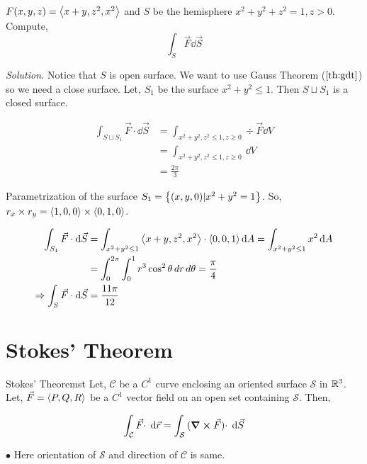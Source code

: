 \documentclass[../Analysis-3]{subfiles}
\begin{document}
\begin{Eg}{}{}
    $F (x,y,z) = \left\langle {x+y}, {z^2,x^2} \right\rangle$ and $S$ be the hemisphere $x^2+y^2+z^2 = 1, z>0$. Compute,
    \[\int_{S} \vec{F} \dd \vec{S}\]

    \textit{Solution.} Notice that $S$ is open surface. We want to  use Gauss Theorem ($\ref{th:gdt}$) so we need a close surface. Let, $S_1$ be the surface $x^2 +y^2 \le 1$. Then $S \sqcup S_1$ is a closed surface.

    \begin{align*}
        \int_{S \sqcup S_1} \vec{F}\cdot \dd \vec{S} & = \int_{x^2+y^2,z^2 \le 1, z \ge 0} \div \vec{F} \dd{V} \\
                                                     & = \int_{x^2+y^2,z^2 \le 1, z \ge 0}\,\dd{V}           \\
                                                     & = \frac{2\pi}{3}
    \end{align*}

    Parametrization of the surface $S_1 =\qty{(x,y,0) | x^2+y^2 = 1}$. So, $r_x \times r_y = \left\langle {1,0}, {0} \right\rangle \times \left\langle {0,1}, {0} \right\rangle$.

    \begin{align*}
        \int_{S_1} \vec{F} \cdot \dd \vec{S}           & = \int_{x^2+y^2 \le 1} \left\langle {x+y}, {z^2,x^2} \right\rangle \cdot \left\langle {0,0}, {1} \right\rangle \dd{A} = \int_{x^2+y^2 \le 1} x^2 \dd{A} \\
                                                       & = \int_{0}^{2\pi} \int_{0}^{1} r^3 \cos^2 \theta \,dr \,d\theta = \frac{\pi}{4}                       \\
        \Rightarrow \int_{S} \vec{F} \cdot \dd \vec{S} & = \frac{11\pi}{12}
    \end{align*}
\end{Eg}

\section{Stokes' Theorem}
\begin{Thm}{Stokes' Theorem}{st}
    Let, $\mathcal{C}$ be a $C^1$ curve enclosing an oriented surface $\mathcal{S}$ in $\mathbb{R}^3$. Let,  $\vec{F} = \left\langle {P,Q}, {R} \right\rangle$ be a $C^1$ vector field on an open set containing $\mathcal{S}$. Then,

    \small \[\int_{\mathcal{C}} {\vec{F} \cdot } \hspace{0.1cm} \dd {\vec{r}} = \int_{\mathcal{S}} {(\curl \vec{F}) \cdot} \hspace{0.1cm} \dd {\vec{S}}  \]

    $\bullet$ Here orientation of $\mathcal{S}$ and direction of $\mathcal{C}$ is same.
\end{Thm}
\end{document}
